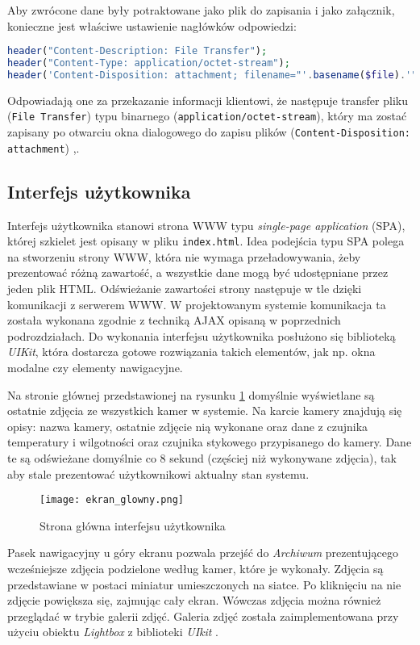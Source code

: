 \documentclass[a4paper,11pt,twoside]{article}
\begin{document}
Aby zwrócone dane były potraktowane jako plik do zapisania i jako załącznik, konieczne jest właściwe ustawienie nagłówków odpowiedzi:
\begin{lstlisting}[language=PHP]
header("Content-Description: File Transfer");
header("Content-Type: application/octet-stream");
header('Content-Disposition: attachment; filename="'.basename($file).'"');
\end{lstlisting}
Odpowiadają one za przekazanie informacji klientowi, że następuje transfer pliku (\texttt{File Transfer}) typu binarnego (\texttt{application/octet-stream}), który ma zostać zapisany po otwarciu okna dialogowego do zapisu plików (\texttt{Content-Disposition: attachment}) \cite{content-disposition},\cite{mime2}.

\subsection{Interfejs użytkownika}
Interfejs użytkownika stanowi strona WWW typu \textit{single-page application} (SPA), której szkielet jest opisany w pliku \texttt{index.html}. Idea podejścia typu SPA polega na stworzeniu strony WWW, która nie wymaga przeładowywania, żeby prezentować różną zawartość, a wszystkie dane mogą być udostępniane przez jeden plik HTML. Odświeżanie zawartości strony następuje w tle dzięki komunikacji z serwerem WWW. W projektowanym systemie komunikacja ta została wykonana zgodnie z techniką AJAX opisaną w poprzednich podrozdziałach. Do wykonania interfejsu użytkownika posłużono się biblioteką \textit{UIKit}, która dostarcza gotowe rozwiązania takich elementów, jak np. okna modalne czy elementy nawigacyjne.

Na stronie głównej przedstawionej na rysunku \ref{fig: homepage} domyślnie wyświetlane są ostatnie zdjęcia ze wszystkich kamer w systemie. Na karcie kamery znajdują się opisy: nazwa kamery, ostatnie zdjęcie nią wykonane oraz dane z czujnika temperatury i wilgotności oraz czujnika stykowego przypisanego do kamery. Dane te są odświeżane domyślnie co 8 sekund (częściej niż wykonywane zdjęcia), tak aby stale prezentować użytkownikowi aktualny stan systemu. 
\begin{figure}[H]
\begin{center}
\texttt{[image: ekran\_glowny.png]}
\caption{Strona główna interfejsu użytkownika}
\label{fig: homepage}
\end{center}
\end{figure}
Pasek nawigacyjny u góry ekranu pozwala przejść do \textit{Archiwum} prezentującego wcześniejsze zdjęcia podzielone według kamer, które je wykonały. Zdjęcia są przedstawiane w postaci miniatur umieszczonych na siatce. Po kliknięciu na nie zdjęcie powiększa się, zajmując cały ekran. Wówczas zdjęcia można również przeglądać w trybie galerii zdjęć. Galeria zdjęć została zaimplementowana przy użyciu obiektu \textit{Lightbox} z biblioteki \textit{UIkit} \cite{uikit}.
\end{document}
